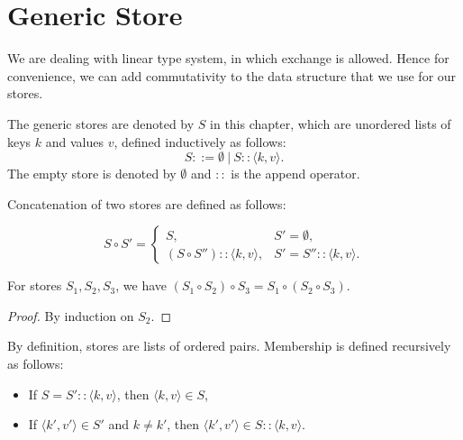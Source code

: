 \chapter{Generic Store}\label{chap:generic-store}

\newcommand{\angkv}{\langle k, v \rangle}
\newcommand{\angkvp}{\langle k', v' \rangle}

We are dealing with linear type system, in which exchange is allowed. Hence for convenience, we can add commutativity to the data structure that we use for our stores.


\begin{definition}
The generic stores are denoted by $S$ in this chapter, which are unordered lists of keys $k$ and values $v$, defined inductively as follows:
\begin{equation*}
S ::= \emptyset~|~S :: \angkv.
\end{equation*}
The empty store is denoted by $\emptyset$ and $::$ is the append operator.
\end{definition}

\begin{definition}
Concatenation of two stores are defined as follows:

\begin{equation*}
S \circ S' =
\begin{cases}
    S, & S' = \emptyset, \\
    (S \circ S'') :: \angkv, & S' = S'' :: \angkv.
\end{cases}
\end{equation*}
\end{definition}

\begin{lemma}[Associativity]
For stores $S_1, S_2, S_3$, we have $(S_1 \circ S_2) \circ S_3 = S_1 \circ (S_2 \circ S_3)$.
\end{lemma}
\begin{proof}
By induction on $S_2$.
\end{proof}

\begin{definition}[Membership]
\label{defn:generic-context-membership}
By definition, stores are lists of ordered pairs. Membership is defined recursively as follows:
\begin{itemize}
    \item If $S = S' :: \angkv$, then $\angkv \in S$,
    \item If $\angkvp \in S'$ and $k \not= k'$, then $\angkvp \in S :: \angkv$.
\end{itemize}
\end{definition}

